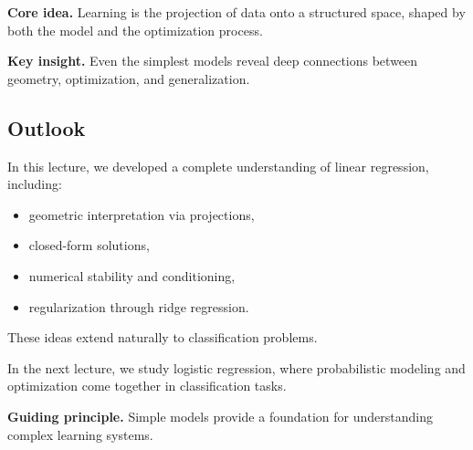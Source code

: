 \medskip

\noindent
\textbf{Core idea.}  
Learning is the projection of data onto a structured space, shaped by both the model and the optimization process.

\medskip

\noindent
\textbf{Key insight.}  
Even the simplest models reveal deep connections between geometry, optimization, and generalization.

\subsection{Outlook}

In this lecture, we developed a complete understanding of linear regression, including:

\begin{itemize}
    \item geometric interpretation via projections,
    \item closed-form solutions,
    \item numerical stability and conditioning,
    \item regularization through ridge regression.
\end{itemize}

\medskip

\noindent
These ideas extend naturally to classification problems.

\medskip

\noindent
In the next lecture, we study logistic regression, where probabilistic modeling and optimization come together in classification tasks.

\medskip

\noindent
\textbf{Guiding principle.}  
Simple models provide a foundation for understanding complex learning systems.